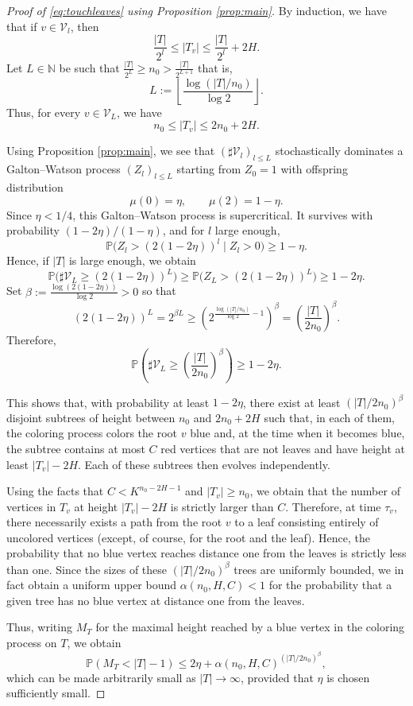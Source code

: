 \documentclass[french]{article}
\renewcommand{\P}{\mathbb{P}}
\newcommand{\Tf}{T}
\renewcommand{\1}{\mathds{1}}
\begin{document}
\begin{proof}[Proof of \eqref{eq:touchleaves} using Proposition \ref{prop:main}]
By induction, we have that if $v\in \mathcal{V}_l$, then
$$
\frac{|\Tf|}{2^l}\le |\Tf_v|\le \frac{|\Tf|}{2^l}+2H.
$$
Let $L\in \mathbb{N}$ be such that
$
\frac{|\Tf|}{2^L}\ge n_0 > \frac{|\Tf|}{2^{L+1}}
$
that is,
$$
L:=\left\lfloor \frac{\log(|\Tf|/n_0)}{\log 2} \right\rfloor.
$$
Thus, for every $v\in \mathcal{V}_L$, we have
$$
n_0 \le |\Tf_v| \le 2n_0 + 2H.
$$

Using Proposition \ref{prop:main}, we see that $(\sharp\mathcal{V}_l)_{l\le L}$ stochastically dominates a Galton--Watson process $(Z_l)_{l\le L}$ starting from $Z_0=1$ with offspring distribution
$$
\mu(0)=\eta, \qquad \mu(2)=1-\eta.
$$
Since $\eta<1/4$, this Galton--Watson process is supercritical. It survives with probability $(1-2\eta)/(1-\eta)$, and for $l$ large enough,
$$
\P\bigl(Z_l>(2(1-2\eta))^l \mid Z_l>0\bigr)\ge 1-\eta.
$$
Hence, if $|\Tf|$ is large enough, we obtain
$$
\P\bigl(\sharp\mathcal{V}_L\ge (2(1-2\eta))^L\bigr)
\ge \P\bigl(Z_L>(2(1-2\eta))^L\bigr)
\ge 1-2\eta.
$$
Set $\beta:=\frac{\log(2(1-2\eta))}{\log 2} >0$ so that
$$
(2(1-2\eta))^L = 2^{\beta L}
\ge \left(2^{\frac{\log(|\Tf|/n_0)}{\log 2}-1}\right)^\beta
= \left(\frac{|\Tf|}{2n_0}\right)^\beta.
$$
Therefore,
$$
\P\left(\sharp\mathcal{V}_L\ge \left(\frac{|\Tf|}{2 n_0}\right)^\beta\right)\ge 1-2\eta.
$$

This shows that, with probability at least $1-2\eta$, there exist at least $(|\Tf|/2n_0)^\beta$ disjoint subtrees of height between $n_0$ and $2n_0+2H$ such that, in each of them, the coloring process colors the root $v$ blue and, at the time when it becomes blue, the subtree contains at most $C$ red vertices that are not leaves and have height at least $|\Tf_v|-2H$. Each of these subtrees then evolves independently.

Using the facts that $C<K^{n_0-2H-1}$ and $|\Tf_v|\ge n_0$, we obtain that the number of vertices in $\Tf_v$ at height $|\Tf_v|-2H$ is strictly larger than $C$. Therefore, at time $\tau_v$, there necessarily exists a path from the root $v$ to a leaf consisting entirely of uncolored vertices (except, of course, for the root and the leaf). Hence, the probability that no blue vertex reaches distance one from the leaves is strictly less than one. Since the sizes of these $(|\Tf|/2n_0)^\beta$ trees are uniformly bounded, we in fact obtain a uniform upper bound $\alpha(n_0,H,C)<1$ for the probability that a given tree has no blue vertex at distance one from the leaves.

Thus, writing $M_{\Tf}$ for the maximal height reached by a blue vertex in the coloring process on $\Tf$, we obtain
$$
\P(M_{\Tf}<|\Tf|-1)\le 2\eta+ \alpha(n_0,H,C)^{(|\Tf|/2n_0)^\beta},
$$
which can be made arbitrarily small as $|\Tf|\to\infty$, provided that $\eta$ is chosen sufficiently small.



\end{proof}
\end{document}
